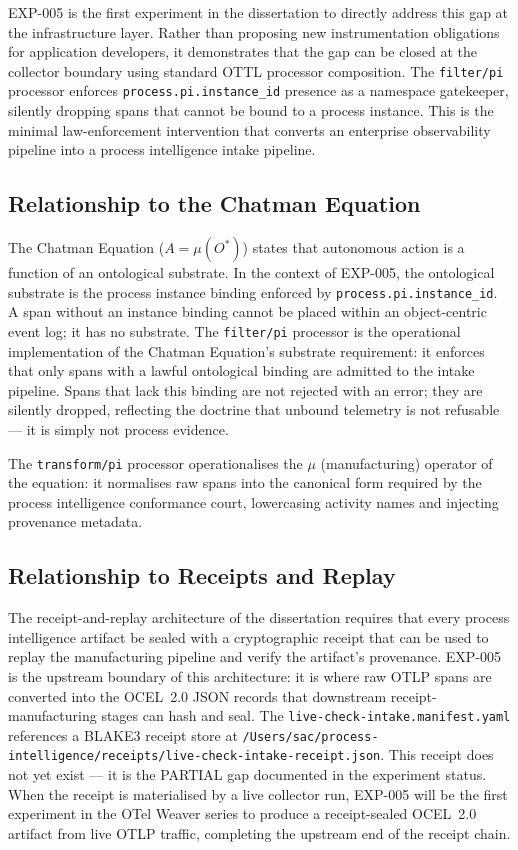 EXP-005 is the first experiment in the dissertation to directly address this gap at the
infrastructure layer. Rather than proposing new instrumentation obligations for application
developers, it demonstrates that the gap can be closed at the collector boundary using
standard OTTL processor composition. The \texttt{filter/pi} processor enforces
\texttt{process.pi.instance\_id} presence as a namespace gatekeeper, silently dropping spans
that cannot be bound to a process instance. This is the minimal law-enforcement intervention
that converts an enterprise observability pipeline into a process intelligence intake pipeline.

\subsection{Relationship to the Chatman Equation}
\label{sec:otel-weaver-exp-005-collector-to-intake-lineage-chatman-equation}

The Chatman Equation ($A = \mu(O^*)$) states that autonomous action is a function of an
ontological substrate. In the context of EXP-005, the ontological substrate is the process
instance binding enforced by \texttt{process.pi.instance\_id}. A span without an instance
binding cannot be placed within an object-centric event log; it has no substrate. The
\texttt{filter/pi} processor is the operational implementation of the Chatman Equation's
substrate requirement: it enforces that only spans with a lawful ontological binding are
admitted to the intake pipeline. Spans that lack this binding are not rejected with an error;
they are silently dropped, reflecting the doctrine that unbound telemetry is not refusable ---
it is simply not process evidence.

The \texttt{transform/pi} processor operationalises the $\mu$ (manufacturing) operator of the
equation: it normalises raw spans into the canonical form required by the process intelligence
conformance court, lowercasing activity names and injecting provenance metadata.

\subsection{Relationship to Receipts and Replay}
\label{sec:otel-weaver-exp-005-collector-to-intake-lineage-receipts}

The receipt-and-replay architecture of the dissertation requires that every process intelligence
artifact be sealed with a cryptographic receipt that can be used to replay the manufacturing
pipeline and verify the artifact's provenance. EXP-005 is the upstream boundary of this
architecture: it is where raw OTLP spans are converted into the OCEL~2.0 JSON records that
downstream receipt-manufacturing stages can hash and seal. The \texttt{live-check-intake.manifest.yaml}
references a BLAKE3 receipt store at
\texttt{/Users/sac/process-intelligence/receipts/live-check-intake-receipt.json}. This
receipt does not yet exist --- it is the PARTIAL gap documented in the experiment status.
When the receipt is materialised by a live collector run, EXP-005 will be the first
experiment in the OTel Weaver series to produce a receipt-sealed OCEL~2.0 artifact from live
OTLP traffic, completing the upstream end of the receipt chain.

